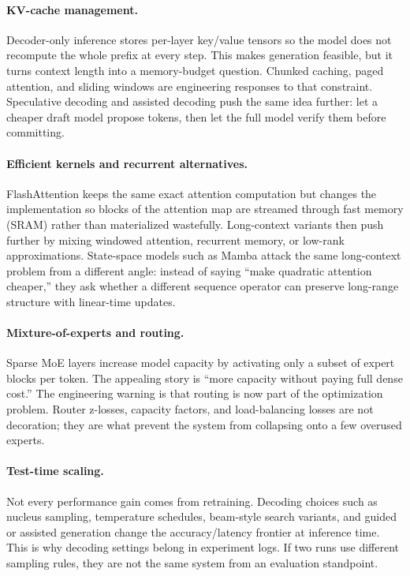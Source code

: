 \paragraph{KV-cache management.}
Decoder-only inference stores per-layer key/value tensors so the model does not recompute the whole prefix at every step. This makes generation feasible, but it turns context length into a memory-budget question. Chunked caching, paged attention, and sliding windows are engineering responses to that constraint. Speculative decoding and assisted decoding push the same idea further: let a cheaper draft model propose tokens, then let the full model verify them before committing.

\paragraph{Efficient kernels and recurrent alternatives.}
FlashAttention \citep{Dao2022FlashAttention} keeps the same exact attention computation but changes the implementation so blocks of the attention map are streamed through fast memory (SRAM) rather than materialized wastefully. Long-context variants then push further by mixing windowed attention, recurrent memory, or low-rank approximations. State-space models such as Mamba \citep{Gu2023Mamba} attack the same long-context problem from a different angle: instead of saying ``make quadratic attention cheaper,'' they ask whether a different sequence operator can preserve long-range structure with linear-time updates.

\paragraph{Mixture-of-experts and routing.}
Sparse MoE layers \citep{Shazeer2017MoE} increase model capacity by activating only a subset of expert blocks per token. The appealing story is ``more capacity without paying full dense cost.'' The engineering warning is that routing is now part of the optimization problem. Router z-losses, capacity factors, and load-balancing losses are not decoration; they are what prevent the system from collapsing onto a few overused experts.

\paragraph{Test-time scaling.}
Not every performance gain comes from retraining. Decoding choices such as nucleus sampling, temperature schedules, beam-style search variants, and guided or assisted generation change the accuracy/latency frontier at inference time. This is why decoding settings belong in experiment logs. If two runs use different sampling rules, they are not the same system from an evaluation standpoint.

